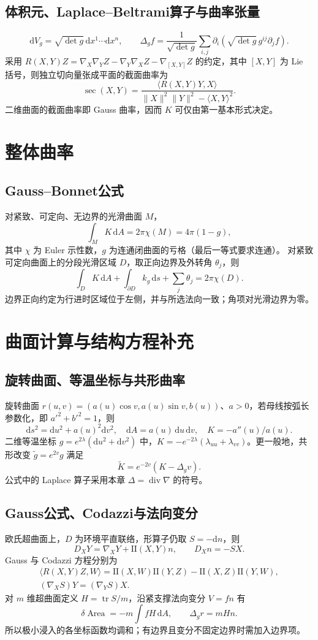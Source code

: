 \documentclass[../main.tex]{subfiles}
\begin{document}
\subsection{体积元、Laplace--Beltrami算子与曲率张量}
\[
\mathrm dV_g=\sqrt{\det g}\,\mathrm dx^1\cdots\mathrm dx^n,\qquad
\Delta_g f=\frac1{\sqrt{\det g}}\sum_{i,j}\partial_i
\left(\sqrt{\det g}\,g^{ij}\partial_j f\right).
\]
采用 $R(X,Y)Z=\nabla_X\nabla_YZ-\nabla_Y\nabla_XZ-\nabla_{[X,Y]}Z$ 的约定，其中 $[X,Y]$ 为 Lie 括号，则独立切向量张成平面的截面曲率为
\[
\sec(X,Y)=\frac{\langle R(X,Y)Y,X\rangle}{\|X\|^2\|Y\|^2-\langle X,Y\rangle^2}.
\]
二维曲面的截面曲率即 Gauss 曲率，因而 $K$ 可仅由第一基本形式决定。
\section{整体曲率}
\subsection{Gauss--Bonnet公式}
对紧致、可定向、无边界的光滑曲面 $M$，
\[
\int_MK\,\mathrm dA=2\pi\chi(M)=4\pi(1-g),
\]
其中 $\chi$ 为 Euler 示性数，$g$ 为连通闭曲面的亏格（最后一等式要求连通）。
对紧致可定向曲面上的分段光滑区域 $D$，取正向边界及外转角 $\theta_j$，则
\[
\int_DK\,\mathrm dA+\int_{\partial D}k_g\,\mathrm ds+\sum_j\theta_j=2\pi\chi(D).
\]
边界正向约定为行进时区域位于左侧，并与所选法向一致；角项对光滑边界为零。
\section{曲面计算与结构方程补充}
\subsection{旋转曲面、等温坐标与共形曲率}
旋转曲面 $r(u,v)=(a(u)\cos v,a(u)\sin v,b(u))$、$a>0$，若母线按弧长参数化，即 $a'^2+b'^2=1$，则
\[
\mathrm ds^2=\mathrm du^2+a(u)^2\mathrm dv^2,\quad
\mathrm dA=a(u)\,\mathrm du\,\mathrm dv,\quad K=-a''(u)/a(u).
\]
二维等温坐标 $g=e^{2\lambda}(\mathrm du^2+\mathrm dv^2)$ 中，$K=-e^{-2\lambda}(\lambda_{uu}+\lambda_{vv})$。更一般地，共形改变 $\widetilde g=e^{2v}g$ 满足
\[
\widetilde K=e^{-2v}(K-\Delta_gv).
\]
公式中的 Laplace 算子采用本章 $\Delta=\operatorname{div}\nabla$ 的符号。
\subsection{Gauss公式、Codazzi与法向变分}
欧氏超曲面上，$D$ 为环境平直联络，形算子仍取 $S=-\mathrm dn$，则
\[
D_XY=\nabla_XY+\mathrm{II}(X,Y)n,\qquad D_Xn=-SX.
\]
Gauss 与 Codazzi 方程分别为
\begin{gather*}
\langle R(X,Y)Z,W\rangle=\mathrm{II}(X,W)\mathrm{II}(Y,Z)-\mathrm{II}(X,Z)\mathrm{II}(Y,W),\\
(\nabla_XS)Y=(\nabla_YS)X.
\end{gather*}
对 $m$ 维超曲面定义 $H=\operatorname{tr}S/m$，沿紧支撑法向变分 $V=fn$ 有
\[
\delta\operatorname{Area}=-m\int fH\,\mathrm dA,\qquad\Delta_g r=mHn.
\]
所以极小浸入的各坐标函数均调和；有边界且变分不固定边界时需加入边界项。
\end{document}
